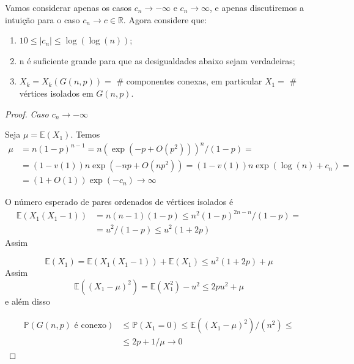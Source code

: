 Vamos considerar apenas os casos $c_n \rightarrow -\infty$ e $c_n \rightarrow \infty$, e apenas discutiremos a intuição para o caso $c_n \rightarrow c \in \mathbb{R}$. Agora considere que:
\begin{enumerate}
    \item $10 \leq |c_n| \leq \log(\log(n))$;
    \item n é suficiente grande para que as desigualdades abaixo sejam verdadeiras;
    \item $X_k = X_k(G(n,p)) =$ \# componentes conexas, em particular $X_1 = $ \# vértices isolados em $G(n,p)$.
\end{enumerate}{}

\begin{proof}

\emph{Caso $c_n \rightarrow -\infty$}

Seja $\mu = \mathbb{E}(X_1)$. Temos 
\begin{align*}
    \mu & = n(1 -p)^{n - 1} = n(\exp(-p + O(p^2)))^n / (1 - p) = \\
        & = (1 - v(1))n \exp(-np + O(np^2)) = (1 - v(1))n \exp(\log(n) + c_n) = \\
        & = (1 + O(1))\exp(-c_n) \rightarrow \infty
\end{align*}{}

O número esperado de pares ordenados de vértices isolados é
\begin{align*}
    \mathbb{E}(X_1(X_1 - 1)) & = n(n-1)(1-p) \leq n^2 (1-p)^{2n -n}/ (1-p) = \\
                             & = u^2/(1 - p) \leq u^2 (1 + 2p)
\end{align*}
Assim

\begin{equation*}
    \mathbb{E}(X_1) = \mathbb{E}(X_1(X_1 - 1)) + \mathbb{E}(X_1) \leq u^2 (1 + 2p) + \mu
\end{equation*}
Assim
\begin{equation*}
    \mathbb{E}((X_1 - \mu)^2) = \mathbb{E}(X_1^2) - u^2 \leq 2pu^2 + \mu
\end{equation*}
e além disso

\begin{align*}
    \mathbb{P}(G(n,p) \text{ é conexo}) & \leq \mathbb{P}(X_1 = 0) \leq \mathbb{E}((X_1 - \mu)^2)/(n^2) \leq \\
    & \leq 2p + 1/\mu \rightarrow 0
\end{align*}
\end{proof}

